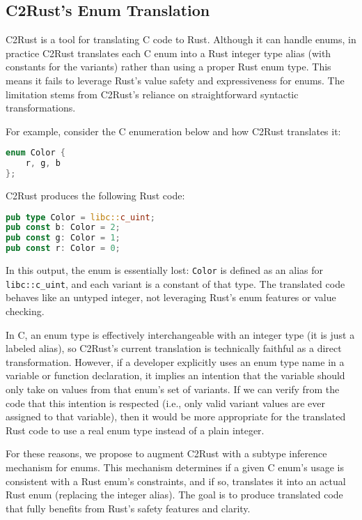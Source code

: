 \documentclass[peerreview, 10pt]{IEEEtran}
\begin{document}
\subsection{C2Rust's Enum Translation}

C2Rust is a tool for translating C code to Rust. Although it can handle enums, in practice C2Rust translates each C enum into a Rust integer type alias (with constants for the variants) rather than using a proper Rust enum type. This means it fails to leverage Rust's value safety and expressiveness for enums. The limitation stems from C2Rust's reliance on straightforward syntactic transformations.

For example, consider the C enumeration below and how C2Rust translates it:

\begin{lstlisting}[language=C]
enum Color {
    r, g, b
};
\end{lstlisting}

C2Rust produces the following Rust code:

\begin{lstlisting}[language=Rust]
pub type Color = libc::c_uint;
pub const b: Color = 2;
pub const g: Color = 1;
pub const r: Color = 0;
\end{lstlisting}

In this output, the enum is essentially lost: \texttt{Color} is defined as an alias for \texttt{libc::c\_uint}, and each variant is a constant of that type. The translated code behaves like an untyped integer, not leveraging Rust's enum features or value checking.

In C, an enum type is effectively interchangeable with an integer type (it is just a labeled alias), so C2Rust's current translation is technically faithful as a direct transformation. However, if a developer explicitly uses an enum type name in a variable or function declaration, it implies an intention that the variable should only take on values from that enum's set of variants. If we can verify from the code that this intention is respected (i.e., only valid variant values are ever assigned to that variable), then it would be more appropriate for the translated Rust code to use a real enum type instead of a plain integer.

For these reasons, we propose to augment C2Rust with a subtype inference mechanism for enums. This mechanism determines if a given C enum's usage is consistent with a Rust enum's constraints, and if so, translates it into an actual Rust enum (replacing the integer alias). The goal is to produce translated code that fully benefits from Rust's safety features and clarity.
\end{document}
